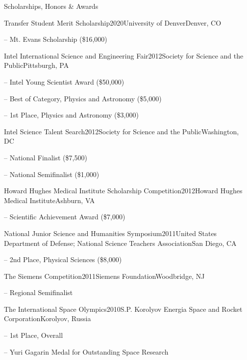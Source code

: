 \documentclass{cv} %
\begin{document}

\begin{cvSection}{Scholarships, Honors \& Awards}
\begin{cvSubsectionAwards}{Transfer Student Merit Scholarship}{2020}{University of Denver}{Denver, CO}
    \item[--] Mt. Evans Scholarship (\$16,000)
\end{cvSubsectionAwards}
\begin{cvSubsectionAwards}{Intel International Science and Engineering Fair}{2012}{Society for Science and the Public}{Pittsburgh, PA}
    \item[--] Intel Young Scientist Award (\$50,000)
    \item[--] Best of Category, Physics and Astronomy (\$5,000)
    \item[--] 1st Place, Physics and Astronomy (\$3,000)
\end{cvSubsectionAwards}

\begin{cvSubsectionAwards}{Intel Science Talent Search}{2012}{Society for Science and the Public}{Washington, DC}
    \item[--] National Finalist (\$7,500)
    \item[--] National Semifinalist (\$1,000)
\end{cvSubsectionAwards}
\begin{cvSubsectionAwards}{Howard Hughes Medical Institute Scholarship Competition}{2012}{Howard Hughes Medical Institute}{Ashburn, VA}
    \item[--] Scientific Achievement Award (\$7,000)
\end{cvSubsectionAwards}

\begin{cvSubsectionAwards}{National Junior Science and Humanities Symposium}{2011}{United States Department of Defense; National Science Teachers Association}{San Diego, CA}
    \item[--] 2nd Place, Physical Sciences (\$8,000)
\end{cvSubsectionAwards}

\begin{cvSubsectionAwards}{The Siemens Competition}{2011}{Siemens Foundation}{Woodbridge, NJ}
    \item[--] Regional Semifinalist
\end{cvSubsectionAwards}
\begin{cvSubsectionAwards}{The International Space Olympics}{2010}{S.P. Korolyov Energia Space and Rocket Corporation}{Korolyov,
Russia}
    \item[--] 1st Place, Overall
    \item[--] Yuri Gagarin Medal for Outstanding Space Research
\end{cvSubsectionAwards}
\end{cvSection}
\end{document}
